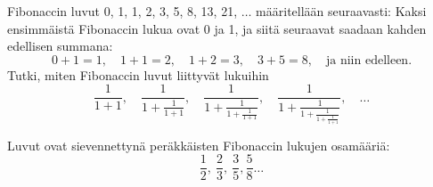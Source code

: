 \begin{tehtava}
Fibonaccin luvut 0, 1, 1, 2, 3, 5, 8, 13, 21, $\ldots$ määritellään seuraavasti: Kaksi ensimmäistä
Fibonaccin lukua ovat 0 ja 1, ja siitä seuraavat saadaan kahden
edellisen summana: 
\[ 0+1=1, \quad 1+1=2, \quad 1+2 = 3, \quad 3+5=8, \quad 
\textrm{ja niin edelleen.} \]
Tutki, miten Fibonaccin luvut liittyvät lukuihin
\[ \frac{1}{1+1}, \quad \frac{1}{1+\frac{1}{1+1}}, \quad
\frac{1}{1+\frac{1}{1+\frac{1}{1+1}}}, \quad 
\frac{1}{1+\frac{1}{1+\frac{1}{1+\frac{1}{1+1}}}}, \quad \ldots\]
\begin{vastaus}
Luvut ovat sievennettynä peräkkäisten Fibonaccin
lukujen osamääriä:
\[\frac{1}{2}, \ \frac{2}{3}, \ \frac{3}{5}, \frac{5}{8} \ldots  \]
\end{vastaus}
\end{tehtava}


